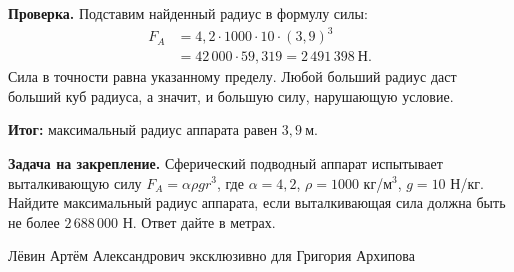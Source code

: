 \documentclass[12pt,a4paper]{article}
\newcommand{\ReviewField}[1]{{\color{ReviewTeal}\bfseries #1}\space}
\begin{document}
\ReviewField{Проверка.} Подставим найденный радиус в формулу силы:
\[
\begin{aligned}
F_A&=4{,}2\cdot1000\cdot10\cdot(3{,}9)^3\\
&=42\,000\cdot59{,}319=2\,491\,398\ \text{Н}.
\end{aligned}
\]
Сила в точности равна указанному пределу. Любой больший радиус даст больший куб радиуса, а значит, и большую силу, нарушающую условие.

\ReviewField{Итог:} максимальный радиус аппарата равен $\boxed{3{,}9\ \text{м}}$.

\ReviewField{Задача на закрепление.} Сферический подводный аппарат испытывает выталкивающую силу $F_A=\alpha\rho gr^3$, где $\alpha=4{,}2$, $\rho=1000$ кг/м$^3$, $g=10$ Н/кг. Найдите максимальный радиус аппарата, если выталкивающая сила должна быть не более $2\,688\,000$ Н. Ответ дайте в метрах.
\vfill
\begin{center}
{\small\color{ReviewMuted}Лёвин Артём Александрович эксклюзивно для Григория Архипова}
\end{center}
\end{document}
